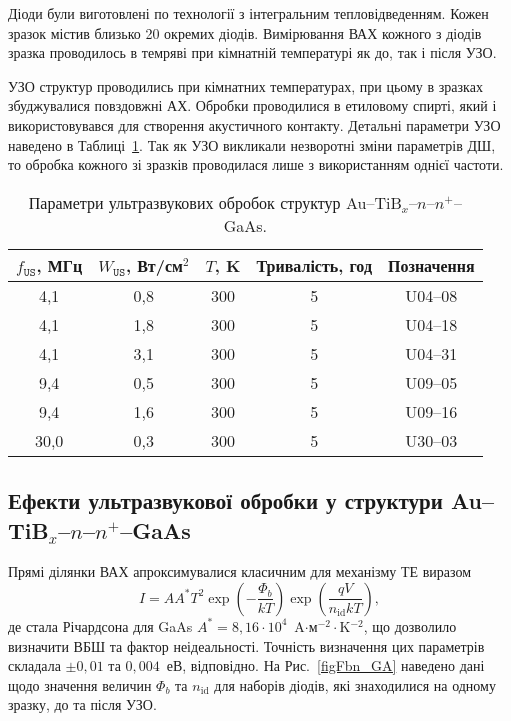\documentclass[a4paper,14pt,oneside,openany]{memoir}
\begin{document}
Діоди були виготовлені по технології з інтегральним тепловідведенням.
Кожен зразок містив близько 20 окремих діодів.
Вимірювання ВАХ кожного з діодів зразка проводилось в темряві при кімнатній температурі
як до, так і після УЗО.

УЗО структур проводились при кімнатних температурах, при цьому в зразках збуджувалися повздовжні АХ.
Обробки проводилися в етиловому спирті, який і використовувався для створення акустичного контакту.
Детальні параметри УЗО наведено в Таблиці~\ref{tabUST}.
Так як УЗО викликали незворотні зміни параметрів ДШ, то обробка кожного зі зразків проводилася лише з використанням однієї частоти.

\begin{table}
\caption{\label{tabUST}Параметри ультразвукових обробок структур Au--TiB$_x$--$n$--$n^+$--GaAs.
}
\center
\begin{tabular}{|c|c|c|c|c|}
\hline
$f_\mathtt{US}$, МГц&$W_{\mathtt{US}}$, Вт/см$^2$&$T$, K&Тривалість, год &Позначення\\
\hline
4,1&0,8&300&5&U04--08\\ \hline
4,1&1,8&300&5&U04--18\\ \hline
4,1&3,1&300&5&U04--31\\ \hline
9,4&0,5&300&5&U09--05\\ \hline
9,4&1,6&300&5&U09--16\\ \hline
30,0&0,3&300&5&U30--03\\ \hline
\end{tabular}
\end{table}


\subsection{Ефекти ультразвукової обробки у структури Au--TiB$_x$--$n$--$n^+$--GaAs}

Прямі ділянки ВАХ апроксимувалися класичним для механізму ТЕ виразом
\begin{equation}\label{eqIVGAMS}
  I=AA^*T^2\exp\left(-\frac{\Phi_b}{kT}\right)\exp\left(\frac{qV}{n_\mathrm{id}kT}\right),
\end{equation}
де стала Річардсона для GaAs $A^*=8,16\cdot10^4$~A$\cdot$м$^{-2}\cdot$K$^{-2}$,
що дозволило визначити ВБШ та фактор неідеальності.
Точність визначення цих параметрів складала $\pm0,01$ та $0,004$~еВ, відповідно.
На Рис.~\ref{figFbn_GA} наведено дані щодо значення величин $\Phi_b$ та $n_\mathrm{id}$
для наборів діодів, які знаходилися на одному зразку, до та після УЗО.
\end{document}
